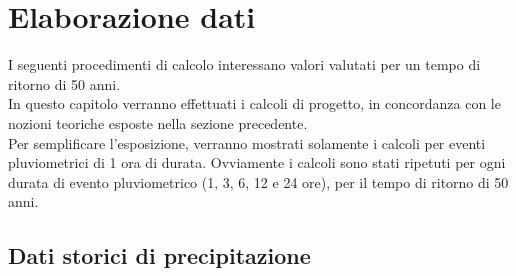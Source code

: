 \section{Elaborazione dati}
I seguenti procedimenti di calcolo interessano valori valutati per un tempo di ritorno di 50 anni.\\
In questo capitolo verranno effettuati i calcoli di progetto, in concordanza con le nozioni teoriche esposte nella sezione precedente.\\
Per semplificare l'esposizione, verranno mostrati solamente i calcoli per eventi pluviometrici di 1 ora di durata. Ovviamente i calcoli sono stati ripetuti per ogni durata di evento pluviometrico (1, 3, 6, 12 e 24 ore), per il tempo di ritorno di 50 anni.
\subsection{Dati storici di precipitazione}
